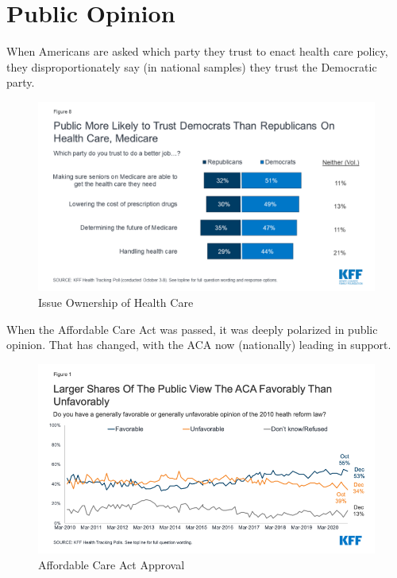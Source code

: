 \documentclass[
  oneside]{book}
\begin{document}
\hypertarget{public-opinion}{%
\section{Public Opinion}\label{public-opinion}}

When Americans are asked which party they trust to enact health care policy, they disproportionately say (in national samples) they trust the Democratic party.

\begin{figure}
\includegraphics[width=0.99\linewidth]{Plots/Web/party_trust_healthcare} \caption{Issue Ownership of Health Care}\label{fig:pew-health-ownership}
\end{figure}

When the Affordable Care Act was passed, it was deeply polarized in public opinion. That has changed, with the ACA now (nationally) leading in support.

\begin{figure}
\includegraphics[width=0.99\linewidth]{Plots/Web/aca_favor_dec20} \caption{Affordable Care Act Approval}\label{fig:kff-aca}
\end{figure}
\end{document}

